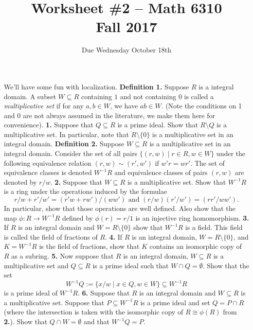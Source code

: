 \documentclass[11pt]{amsart}
\theoremstyle{theorem}
\renewcommand{\to}[1][]{\xrightarrow{\ #1\ }}
\begin{document}
\title{Worksheet \#2 -- Math 6310\\Fall 2017}
\author{Due Wednesday October 18th}
\maketitle

We'll have some fun with localization.
\vskip 9pt
\noindent
{\bf Definition 1.}  Suppose $R$ is a integral domain.  A subset $W \subseteq R$ containing $1$ and not containing $0$ is called a \emph{multiplicative set} if for any $a,b \in W$, we have $ab \in W$.  (Note the conditions on 1 and 0 are not always assumed in the literature, we make them here for convenience).
\vskip 9pt
\noindent
{\bf 1.}  Suppose that $Q \subseteq R$ is a prime ideal.  Show that $R \setminus Q$ is a multiplicative set.  In particular, note that $R \setminus \{0 \}$ is a multiplicative set in an integral domain.
\vskip 150pt
\noindent
{\bf Definition 2.}  Suppose $W \subseteq R$ is a multiplicative set in an integral domain.  Consider the set of all pairs $\{(r, w) \;|\; r \in R, w \in W \}$ under the following equivalence relation $(r, w) \sim (r', w')$ if $w' r = w r'$.  The set of equivalence classes is denoted $W^{-1} R$ and equivalence classes of pairs $(r, w)$ are denoted by $r/w$.
\vskip 9pt
\noindent
{\bf 2.}  Suppose that $W \subseteq R$ is a multiplicative set.  Show that $W^{-1} R$ is a ring under the operations induced by the formulae
\[
r/w + r'/w' = (r'w + rw')/(ww') \text{ and } (r/w)(r'/w') = (rr'/ww').
\]
In particular, show that those operations are well defined.  Also show that the map $\phi : R \to W^{-1} R$ defined by $\phi(r) = r/1$ is an injective ring homomorphism.
\newpage
\noindent
{\bf 3.}  If $R$ is an integral domain and $W = R \setminus \{ 0 \}$ show that $W^{-1}R$ is a field.  This field is called the field of fractions of $R$.
\vskip 100pt
\noindent
{\bf 4.}  If $R$ is an integral domain, $W = R \setminus \{ 0 \}$, and $K = W^{-1} R$ is the field of fractions, show that $K$ contains an isomorphic copy of $R$ as a subring.
\vskip 100pt
\noindent
{\bf 5.}  Now suppose that $R$ is an integral domain, $W \subseteq R$ is a multiplicative set and $Q \subseteq R$ is a prime ideal such that $W \cap Q = \emptyset$.  Show that the set
\[
W^{-1} Q := \{ x/w \;|\; x \in Q, w \in W \} \subseteq W^{-1} R
\]
is a prime ideal of $W^{-1} R$.
\newpage
\noindent
{\bf 6.}  Suppose that $R$ is an integral domain and $W \subseteq R$ is a multiplicative set.  Suppose that $P \subseteq W^{-1} R$ is a prime ideal and set $Q = P \cap R$ (where the intersection is taken with the isomorphic copy of $R \cong \phi(R)$ from {\bf 2.}).  Show that $Q \cap W = \emptyset$ and that $W^{-1} Q = P$.
\end{document}
